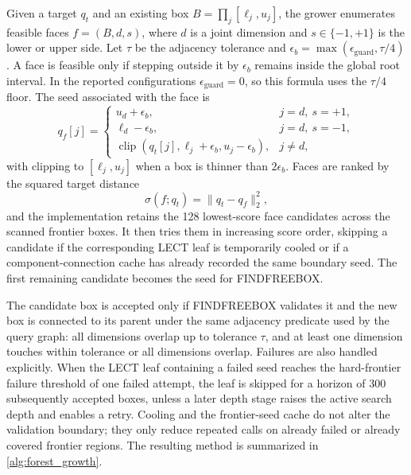 \documentclass[journal]{IEEEtran}
\DeclareRobustCommand{\textsc}[1]{\textnormal{\MakeUppercase{#1}}}
\begin{document}
Given a target $q_t$ and an existing box
$B=\prod_j[\ell_j,u_j]$, the grower enumerates feasible faces
$f=(B,d,s)$, where $d$ is a joint dimension and $s\in\{-1,+1\}$ is the lower or
upper side. Let $\tau$ be the adjacency tolerance and
$\epsilon_b=\max(\epsilon_{\mathrm{guard}},\tau/4)$. A face is feasible only if
stepping outside it by $\epsilon_b$ remains inside the global root interval. In
the reported configurations $\epsilon_{\mathrm{guard}}=0$, so this formula uses
the $\tau/4$ floor. The
seed associated with the face is
\begin{equation}
q_f[j] =
\begin{cases}
u_d+\epsilon_b, & j=d,\ s=+1,\\
\ell_d-\epsilon_b, & j=d,\ s=-1,\\
\operatorname{clip}(q_t[j],\ell_j+\epsilon_b,u_j-\epsilon_b), & j\ne d,
\end{cases}
\end{equation}
with clipping to $[\ell_j,u_j]$ when a box is thinner than $2\epsilon_b$. Faces
are ranked by the squared target distance
\begin{equation}
  \sigma(f;q_t)=\|q_t-q_f\|_2^2,
\end{equation}
and the implementation retains the 128 lowest-score face candidates across the
scanned frontier boxes. It then tries them in increasing score order, skipping a
candidate if the corresponding LECT leaf is temporarily cooled or if a
component-connection cache has already recorded the same boundary seed. The
first remaining candidate becomes the seed for \textsc{FindFreeBox}.

The candidate box is accepted only if \textsc{FindFreeBox} validates it and the
new box is connected to its parent under the same adjacency predicate used by
the query graph: all dimensions overlap up to tolerance $\tau$, and at least one
dimension touches within tolerance or all dimensions overlap. Failures are also
handled explicitly. When the LECT leaf containing a failed seed reaches the
hard-frontier failure threshold of one failed attempt, the leaf is skipped for a
horizon of 300 subsequently accepted boxes, unless a later depth stage raises
the active search depth and enables a retry. Cooling and the frontier-seed cache
do not alter the validation boundary;
they only reduce repeated calls on already failed or already covered frontier
regions. The resulting method is summarized in \cref{alg:forest_growth}.
\end{document}
